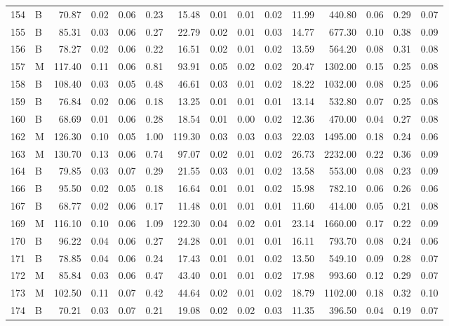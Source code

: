 \begin{table}[ht]
\begin{tabular}{rlrrrrrrrrrrrrr}
  154 & B & 70.87 & 0.02 & 0.06 & 0.23 & 15.48 & 0.01 & 0.01 & 0.02 & 11.99 & 440.80 & 0.06 & 0.29 & 0.07 \\ 
  155 & B & 85.31 & 0.03 & 0.06 & 0.27 & 22.79 & 0.02 & 0.01 & 0.03 & 14.77 & 677.30 & 0.10 & 0.38 & 0.09 \\ 
  156 & B & 78.27 & 0.02 & 0.06 & 0.22 & 16.51 & 0.02 & 0.01 & 0.02 & 13.59 & 564.20 & 0.08 & 0.31 & 0.08 \\ 
  157 & M & 117.40 & 0.11 & 0.06 & 0.81 & 93.91 & 0.05 & 0.02 & 0.02 & 20.47 & 1302.00 & 0.15 & 0.25 & 0.08 \\ 
  158 & B & 108.40 & 0.03 & 0.05 & 0.48 & 46.61 & 0.03 & 0.01 & 0.02 & 18.22 & 1032.00 & 0.08 & 0.25 & 0.06 \\ 
  159 & B & 76.84 & 0.02 & 0.06 & 0.18 & 13.25 & 0.01 & 0.01 & 0.01 & 13.14 & 532.80 & 0.07 & 0.25 & 0.08 \\ 
  160 & B & 68.69 & 0.01 & 0.06 & 0.28 & 18.54 & 0.01 & 0.00 & 0.02 & 12.36 & 470.00 & 0.04 & 0.27 & 0.08 \\ 
  162 & M & 126.30 & 0.10 & 0.05 & 1.00 & 119.30 & 0.03 & 0.03 & 0.03 & 22.03 & 1495.00 & 0.18 & 0.24 & 0.06 \\ 
  163 & M & 130.70 & 0.13 & 0.06 & 0.74 & 97.07 & 0.02 & 0.01 & 0.02 & 26.73 & 2232.00 & 0.22 & 0.36 & 0.09 \\ 
  164 & B & 79.85 & 0.03 & 0.07 & 0.29 & 21.55 & 0.03 & 0.01 & 0.02 & 13.58 & 553.00 & 0.08 & 0.23 & 0.09 \\ 
  166 & B & 95.50 & 0.02 & 0.05 & 0.18 & 16.64 & 0.01 & 0.01 & 0.02 & 15.98 & 782.10 & 0.06 & 0.26 & 0.06 \\ 
  167 & B & 68.77 & 0.02 & 0.06 & 0.17 & 11.48 & 0.01 & 0.01 & 0.01 & 11.60 & 414.00 & 0.05 & 0.21 & 0.08 \\ 
  169 & M & 116.10 & 0.10 & 0.06 & 1.09 & 122.30 & 0.04 & 0.02 & 0.01 & 23.14 & 1660.00 & 0.17 & 0.22 & 0.09 \\ 
  170 & B & 96.22 & 0.04 & 0.06 & 0.27 & 24.28 & 0.01 & 0.01 & 0.01 & 16.11 & 793.70 & 0.08 & 0.24 & 0.06 \\ 
  171 & B & 78.85 & 0.04 & 0.06 & 0.24 & 17.43 & 0.01 & 0.01 & 0.02 & 13.50 & 549.10 & 0.09 & 0.28 & 0.07 \\ 
  172 & M & 85.84 & 0.03 & 0.06 & 0.47 & 43.40 & 0.01 & 0.01 & 0.02 & 17.98 & 993.60 & 0.12 & 0.29 & 0.07 \\ 
  173 & M & 102.50 & 0.11 & 0.07 & 0.42 & 44.64 & 0.02 & 0.01 & 0.02 & 18.79 & 1102.00 & 0.18 & 0.32 & 0.10 \\ 
  174 & B & 70.21 & 0.03 & 0.07 & 0.21 & 19.08 & 0.02 & 0.02 & 0.03 & 11.35 & 396.50 & 0.04 & 0.19 & 0.07 \\ 

\end{tabular}
\end{table}
